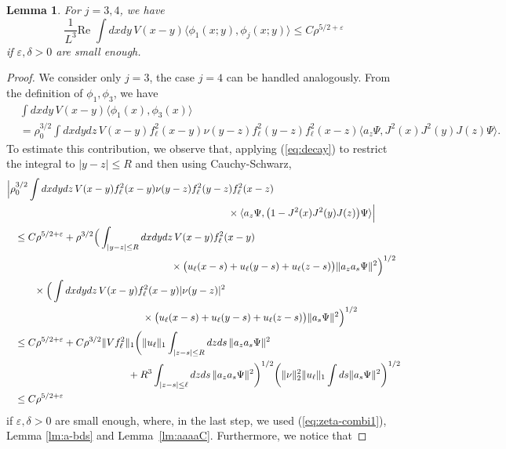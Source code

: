 \documentclass[a4paper,11pt]{article}
\def\eps{\varepsilon}
\newtheorem{lemma}[theorem]{Lemma}
\numberwithin{equation}{section}
\begin{document}
\begin{lemma}\label{lm:phi1phi3} 
For $j=3,4$, we have 
\[ \frac{1}{L^3} \text{Re } \int dx dy \, V(x-y) \langle \phi_1 (x;y) , \phi_j (x;y) \rangle \leq C \rho^{5/2+\eps} \]
if $\eps,\delta > 0$ are small enough.
\end{lemma} 
\begin{proof} 
We consider only $j=3$, the case $j=4$ can be handled analogously. From the definition of $\phi_1, \phi_3$, we have
\[ \begin{split}  &\int dx dy \, V(x-y) \langle \phi_1 (x) , \phi_3 (x) \rangle \\ &= \rho_0^{3/2} \int dx dy dz \, V(x-y) f_\ell^2 (x-y) \nu (y-z) f_\ell^2 (y-z) f_\ell^2 (x-z) \langle a_z \Psi , J^2 (x) J^2 (y) J(z) \Psi \rangle .\end{split} \]
To estimate this contribution, we observe that, applying (\ref{eq:decay}) to restrict the integral to $|y-z| \leq R$ and then using Cauchy-Schwarz, 
\[ \begin{split} 
\Big|  \rho_0^{3/2} &\int dx dy dz \, V(x-y) f_\ell^2 (x-y) \nu (y-z) f_\ell^2 (y-z) f_\ell^2 (x-z) \\ &\hspace{7cm} \times  \langle a_z \Psi , \big(1 - J^2 (x) J^2 (y) J(z)\big)  \Psi \rangle \Big| \\  \leq \; &C \rho^{5/2+\eps} + \rho^{3/2} \Big( \int_{|y-z| \leq R} dx dy dz \, V(x-y)f_\ell^2(x-y) \\
&\hspace{5cm}\times\big( u_\ell (x-s) + u_\ell (y-s) + u_\ell (z-s) \big) \| a_z a_s \Psi \|^2 \Big)^{1/2} \\ &\hspace{.2cm} \times \Big( \int dx dy dz \, V(x-y)f_\ell^2(x-y) |\nu (y-z)|^2 \\
&\hspace{4cm}\times\big( u_\ell (x-s) + u_\ell (y-s) + u_\ell (z-s) \big) \| a_s \Psi \|^2 \Big)^{1/2} \\ \leq \; &C \rho^{5/2+\eps} + C \rho^{3/2} \|Vf_\ell^2\|_1 \bigg( \| u_\ell \|_1 \int_{|z-s| \leq R} dz ds \, \| a_z a_s \Psi \|^2\\
&\hspace{3.5cm}+ R^3 \int_{|z-s| \leq \ell} dz ds \, \| a_z a_s \Psi \|^2 \bigg)^{1/2} \bigg( \| \nu \|_2^2 \| u_\ell \|_1 \int ds \| a_s \Psi \|^2 \bigg)^{1/2} \\ \leq \; &C \rho^{5/2+\eps} 
\end{split} \]
if $\eps,\delta > 0$ are small enough, where, in the last step, we used (\ref{eq:zeta-combi1}), Lemma \ref{lm:a-bds} and Lemma~\ref{lm:aaaaC}. Furthermore, we notice that

\end{proof}
\end{document}
